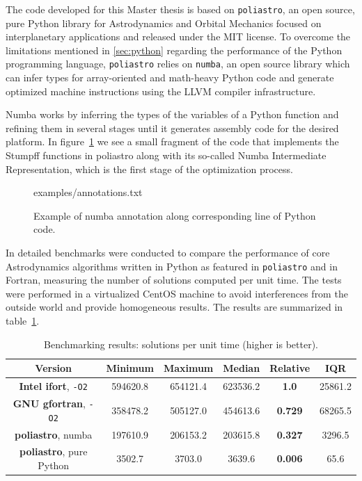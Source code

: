 The code developed for this Master thesis is based on \verb|poliastro|, an open source, pure Python library for Astrodynamics and Orbital Mechanics focused on interplanetary applications and released under the MIT license\cite{cano2017poliastro}. To overcome the limitations mentioned in \ref{sec:python} regarding the performance of the Python programming language, \verb|poliastro| relies on \verb|numba|, an open source library which can infer types for array-oriented and math-heavy Python code and generate optimized machine instructions using the LLVM compiler infrastructure.

Numba works by inferring the types of the variables of a Python function and refining them in several stages until it generates assembly code for the desired platform. In figure~\ref{fig:numba} we see a small fragment of the code that implements the Stumpff functions in poliastro along with its so-called Numba Intermediate Representation, which is the first stage of the optimization process.
% 
% 

\begin{figure}
\begin{lstinputlisting}[language=Python]{examples/annotations.txt}
\end{lstinputlisting}
\caption{Example of numba annotation along corresponding line of Python code.}
\label{fig:numba}
\end{figure}

In \cite{cano2016icatt} detailed benchmarks were conducted to compare the performance of core Astrodynamics algorithms written in Python as featured in \verb|poliastro| and in Fortran, measuring the number of solutions computed per unit time. The tests were performed in a virtualized CentOS machine to avoid interferences from the outside world and provide homogeneous results. The results are summarized in table~\ref{table:results}.

\begin{table}
    \centering
    \begin{tabular}{ c|c c c c c }
          \textbf{Version} & \textbf{Minimum} & \textbf{Maximum} & \textbf{Median} & \textbf{Relative} & \textbf{IQR} \\
    \hline
        \textbf{Intel ifort}, \verb|-O2| & 594620.8 & 654121.4 & 623536.2 & \textbf{1.0} & 25861.2 \\ 
        \textbf{GNU gfortran}, \verb|-O2| & 358478.2 & 505127.0 & 454613.6 & \textbf{0.729} & 68265.5 \\ 
        \textbf{poliastro}, numba & 197610.9 & 206153.2 & 203615.8 & \textbf{0.327} & 3296.5 \\ 
        \textbf{poliastro}, pure Python & 3502.7 & 3703.0 & 3639.6 & \textbf{0.006} & 65.6 \\ 
    \end{tabular}
    \caption{Benchmarking results: solutions per unit time (higher is better).}
    \label{table:results}
\end{table}


